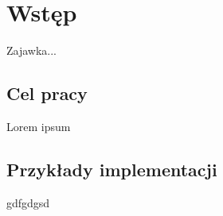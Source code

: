 \chapter*{Wstęp}
Zajawka...

\section*{Cel pracy}
Lorem ipsum

\section*{Przykłady implementacji}
gdfgdgsd